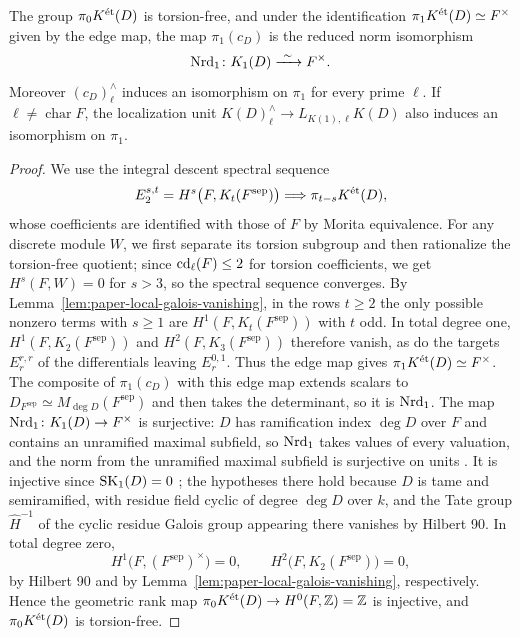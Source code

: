 \begin{lemma}\label{lem:paper-local-low-descent}
The group $\pi_0K^{\mathrm{\acute et}}(D)$ is torsion-free, and under the identification $\pi_1K^{\mathrm{\acute et}}(D)\simeq F^\times$ given by the edge map, the map $\pi_1(c_D)$ is the reduced norm isomorphism
\[
 \Nrd_1\colon K_1(D)\xrightarrow{\ \sim\ }F^\times.
\]
Moreover $(c_D)^\wedge_\ell$ induces an isomorphism on $\pi_1$ for every prime $\ell$.
If $\ell\ne\operatorname{char}F$, the localization unit $K(D)^\wedge_\ell\to L_{K(1),\ell}K(D)$ also induces an isomorphism on $\pi_1$.
\end{lemma}
\begin{proof}
We use the integral descent spectral sequence
\[
 E_2^{s,t}=H^s\bigl(F,K_t(F^{\mathrm{sep}})\bigr)\Longrightarrow\pi_{t-s}K^{\mathrm{\acute et}}(D),
\]
whose coefficients are identified with those of $F$ by Morita equivalence.
For any discrete module $W$, we first separate its torsion subgroup and then rationalize the torsion-free quotient; since $\operatorname{cd}_\ell(F)\le2$ for torsion coefficients, we get $H^s(F,W)=0$ for $s>3$, so the spectral sequence converges.
By Lemma~\ref{lem:paper-local-galois-vanishing}, in the rows $t\ge2$ the only possible nonzero terms with $s\ge1$ are $H^1(F,K_t(F^{\mathrm{sep}}))$ with $t$ odd.
In total degree one, $H^1(F,K_2(F^{\mathrm{sep}}))$ and $H^2(F,K_3(F^{\mathrm{sep}}))$ therefore vanish, as do the targets $E_r^{r,r}$ of the differentials leaving $E_r^{0,1}$.
Thus the edge map gives $\pi_1K^{\mathrm{\acute et}}(D)\simeq F^\times$.
The composite of $\pi_1(c_D)$ with this edge map extends scalars to $D_{F^{\mathrm{sep}}}\simeq M_{\deg D}(F^{\mathrm{sep}})$ and then takes the determinant, so it is $\operatorname{Nrd}_1$.
The map $\operatorname{Nrd}_1\colon K_1(D)\to F^\times$ is surjective: $D$ has ramification index $\deg D$ over $F$ and contains an unramified maximal subfield, so $\operatorname{Nrd}_1$ takes values of every valuation, and the norm from the unramified maximal subfield is surjective on units \cite[V, \S2, Proposition 3(b) and its Corollary; XII, \S2, Propositions 1--2 and Exercises 2--3]{SerreLocal}.
It is injective since $\operatorname{SK}_1(D)=0$ \cite[Corollary 4.10(iii)]{HazratWadsworth}; the hypotheses there hold because $D$ is tame and semiramified, with residue field cyclic of degree $\deg D$ over $k$, and the Tate group $\widehat H^{-1}$ of the cyclic residue Galois group appearing there vanishes by Hilbert 90.
In total degree zero,
\[
 H^1\bigl(F,(F^{\mathrm{sep}})^\times\bigr)=0,\qquad H^2\bigl(F,K_2(F^{\mathrm{sep}})\bigr)=0,
\]
by Hilbert 90 and by Lemma~\ref{lem:paper-local-galois-vanishing}, respectively.
Hence the geometric rank map $\pi_0K^{\mathrm{\acute et}}(D)\to H^0(F,\mathbb Z)=\mathbb Z$ is injective, and $\pi_0K^{\mathrm{\acute et}}(D)$ is torsion-free.


\end{proof}
